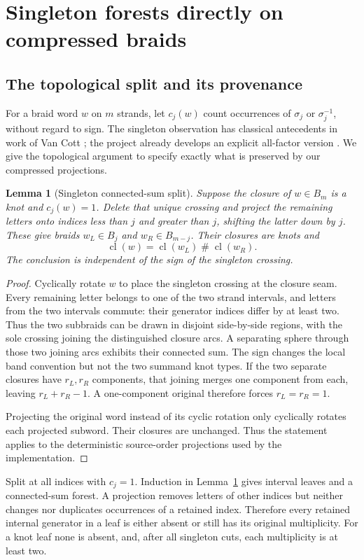 \documentclass[11pt,letterpaper]{article}
\newtheorem{lemma}[theorem]{Lemma}
\theoremstyle{definition}\newtheorem{definition}[theorem]{Definition}
\theoremstyle{remark}\newtheorem{remark}[theorem]{Remark}
\newcommand{\cl}{\operatorname{cl}}
\begin{document}
\section{Singleton forests directly on compressed braids}
\subsection{The topological split and its provenance}
For a braid word $w$ on $m$ strands, let $c_j(w)$ count occurrences of $\sigma_j$ or $\sigma_j^{-1}$, without regard to sign. The singleton observation has classical antecedents in work of Van Cott \cite{vancott}; the project already develops an explicit all-factor version \cite{minority}. We give the topological argument to specify exactly what is preserved by our compressed projections.

\begin{lemma}[Singleton connected-sum split]\label{lem:split}
Suppose the closure of $w\in B_m$ is a knot and $c_j(w)=1$. Delete that unique crossing and project the remaining letters onto indices less than $j$ and greater than $j$, shifting the latter down by $j$. These give braids $w_L\in B_j$ and $w_R\in B_{m-j}$. Their closures are knots and
\[
 \cl(w)=\cl(w_L)\mathbin{\#}\cl(w_R).
\]
The conclusion is independent of the sign of the singleton crossing.
\end{lemma}
\begin{proof}
Cyclically rotate $w$ to place the singleton crossing at the closure seam. Every remaining letter belongs to one of the two strand intervals, and letters from the two intervals commute: their generator indices differ by at least two. Thus the two subbraids can be drawn in disjoint side-by-side regions, with the sole crossing joining the distinguished closure arcs. A separating sphere through those two joining arcs exhibits their connected sum. The sign changes the local band convention but not the two summand knot types. If the two separate closures have $r_L,r_R$ components, that joining merges one component from each, leaving $r_L+r_R-1$. A one-component original therefore forces $r_L=r_R=1$.

Projecting the original word instead of its cyclic rotation only cyclically rotates each projected subword. Their closures are unchanged. Thus the statement applies to the deterministic source-order projections used by the implementation.
\end{proof}

Split at all indices with $c_j=1$. Induction in Lemma~\ref{lem:split} gives interval leaves and a connected-sum forest. A projection removes letters of other indices but neither changes nor duplicates occurrences of a retained index. Therefore every retained internal generator in a leaf is either absent or still has its original multiplicity. For a knot leaf none is absent, and, after all singleton cuts, each multiplicity is at least two.
\end{document}
